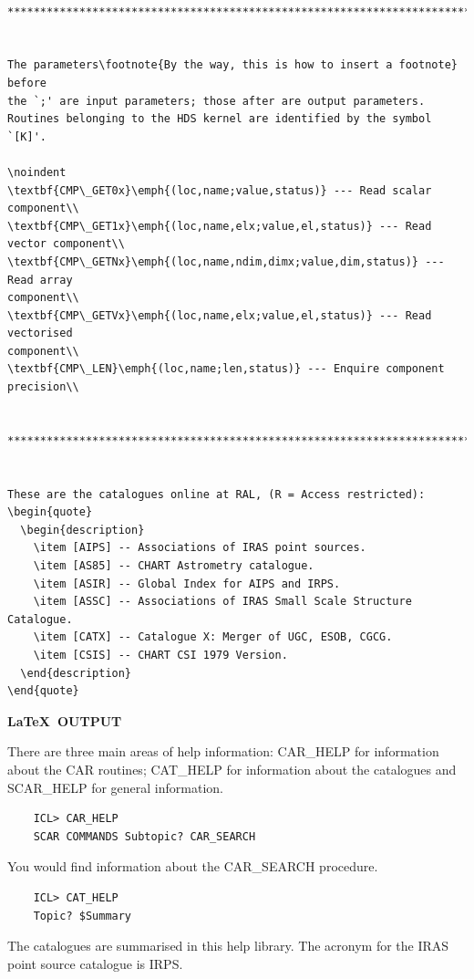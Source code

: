 \documentclass[twoside,11pt]{article}
\begin{document}
\begin{verbatim}

******************************************************************************


The parameters\footnote{By the way, this is how to insert a footnote} before
the `;' are input parameters; those after are output parameters.
Routines belonging to the HDS kernel are identified by the symbol `[K]'.

\noindent
\textbf{CMP\_GET0x}\emph{(loc,name;value,status)} --- Read scalar component\\
\textbf{CMP\_GET1x}\emph{(loc,name,elx;value,el,status)} --- Read vector component\\
\textbf{CMP\_GETNx}\emph{(loc,name,ndim,dimx;value,dim,status)} --- Read array
component\\
\textbf{CMP\_GETVx}\emph{(loc,name,elx;value,el,status)} --- Read vectorised
component\\
\textbf{CMP\_LEN}\emph{(loc,name;len,status)} --- Enquire component precision\\


******************************************************************************


These are the catalogues online at RAL, (R = Access restricted):
\begin{quote}
  \begin{description}
    \item [AIPS] -- Associations of IRAS point sources.
    \item [AS85] -- CHART Astrometry catalogue.
    \item [ASIR] -- Global Index for AIPS and IRPS.
    \item [ASSC] -- Associations of IRAS Small Scale Structure Catalogue.
    \item [CATX] -- Catalogue X: Merger of UGC, ESOB, CGCG.
    \item [CSIS] -- CHART CSI 1979 Version.
  \end{description}
\end{quote}
\end{verbatim}

\normalsize

\newpage

\begin{center}
  \textbf{\LaTeX\ OUTPUT}
\end{center}

There are three main areas of help information: CAR\_HELP for information
about the CAR routines; CAT\_HELP for information about the catalogues and
SCAR\_HELP for general information.
\begin{verbatim}
    ICL> CAR_HELP
    SCAR COMMANDS Subtopic? CAR_SEARCH
\end{verbatim}
You would find information about the CAR\_SEARCH procedure.
\begin{verbatim}
    ICL> CAT_HELP
    Topic? $Summary
\end{verbatim}
The catalogues are summarised in this help library.
The acronym for the IRAS point source catalogue is IRPS.
\end{document}
